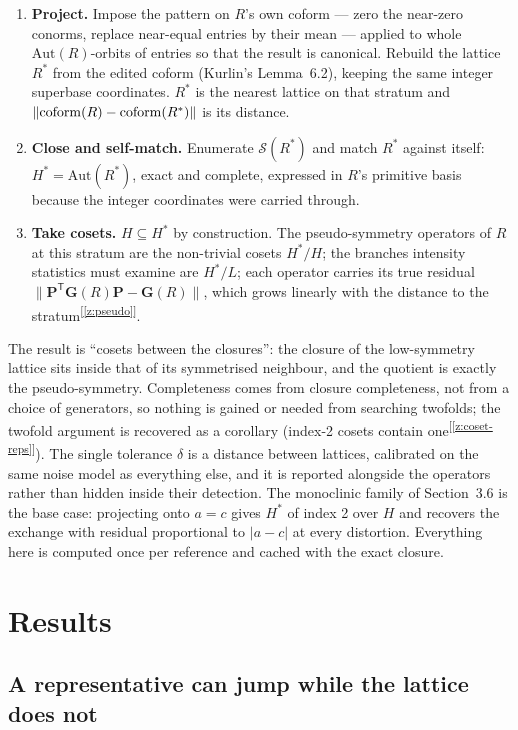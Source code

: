 \documentclass[11pt]{article}
\newcommand{\Gmet}{\mathbf{G}}
\newcommand{\Pop}{\mathbf{P}}
\newcommand{\Sclosure}{\mathcal{S}}
\newcommand{\chk}[1]{\textsuperscript{[\ref{#1}]}}
\begin{document}
\begin{enumerate}
\item \textbf{Project.} Impose the pattern on $R$'s own coform --- zero the near-zero conorms, replace near-equal entries by their mean --- applied to whole $\mathrm{Aut}(R)$-orbits of entries so that the result is canonical. Rebuild the lattice $R^*$ from the edited coform (Kurlin's Lemma~6.2), keeping the same integer superbase coordinates. $R^*$ is the nearest lattice on that stratum and $\|{\rm coform}(R)-{\rm coform}(R^*)\|$ is its distance.
\item \textbf{Close and self-match.} Enumerate $\Sclosure(R^*)$ and match $R^*$ against itself: $H^*=\mathrm{Aut}(R^*)$, exact and complete, expressed in $R$'s primitive basis because the integer coordinates were carried through.
\item \textbf{Take cosets.} $H\subseteq H^*$ by construction. The pseudo-symmetry operators of $R$ at this stratum are the non-trivial cosets $H^*/H$; the branches intensity statistics must examine are $H^*/L$; each operator carries its true residual $\|\Pop^{\mathsf T}\Gmet(R)\Pop-\Gmet(R)\|$, which grows linearly with the distance to the stratum\chk{z:pseudo}.
\end{enumerate}

The result is ``cosets between the closures'': the closure of the low-symmetry lattice sits inside that of its symmetrised neighbour, and the quotient is exactly the pseudo-symmetry. Completeness comes from closure completeness, not from a choice of generators, so nothing is gained or needed from searching twofolds; the twofold argument is recovered as a corollary (index-2 cosets contain one\chk{z:coset-reps}). The single tolerance $\delta$ is a distance between lattices, calibrated on the same noise model as everything else, and it is reported alongside the operators rather than hidden inside their detection. The monoclinic family of Section~3.6 is the base case: projecting onto $a=c$ gives $H^*$ of index 2 over $H$ and recovers the exchange with residual proportional to $|a-c|$ at every distortion. Everything here is computed once per reference and cached with the exact closure.

\section{Results}

\subsection{A representative can jump while the lattice does not}
\end{document}
